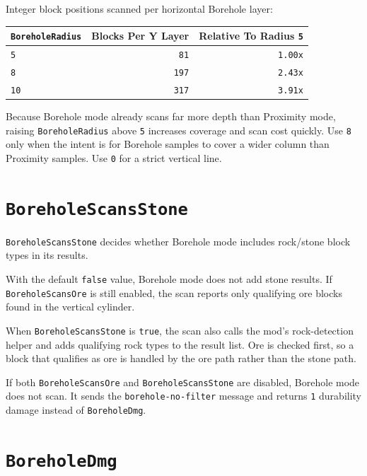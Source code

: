 \documentclass[
  11pt,
  letterpaper,
  titlepage]{article}
\newcounter{none} %
\begin{document}
Integer block positions scanned per horizontal Borehole layer:

{\def\LTcaptype{none} %
\begin{longtable}[]{@{}lrr@{}}
\toprule\noalign{}
\texttt{BoreholeRadius} & Blocks Per Y Layer & Relative To Radius
\texttt{5} \\
\midrule\noalign{}
\endhead
\bottomrule\noalign{}
\endlastfoot
\texttt{5} & \texttt{81} & \texttt{1.00x} \\
\texttt{8} & \texttt{197} & \texttt{2.43x} \\
\texttt{10} & \texttt{317} & \texttt{3.91x} \\
\end{longtable}
}

Because Borehole mode already scans far more depth than Proximity mode,
raising \texttt{BoreholeRadius} above \texttt{5} increases coverage and
scan cost quickly. Use \texttt{8} only when the intent is for Borehole
samples to cover a wider column than Proximity samples. Use \texttt{0}
for a strict vertical line.

\section{\texorpdfstring{\texttt{BoreholeScansStone}}{BoreholeScansStone}}\label{boreholescansstone}

\texttt{BoreholeScansStone} decides whether Borehole mode includes
rock/stone block types in its results.

With the default \texttt{false} value, Borehole mode does not add stone
results. If \texttt{BoreholeScansOre} is still enabled, the scan reports
only qualifying ore blocks found in the vertical cylinder.

When \texttt{BoreholeScansStone} is \texttt{true}, the scan also calls
the mod's rock-detection helper and adds qualifying rock types to the
result list. Ore is checked first, so a block that qualifies as ore is
handled by the ore path rather than the stone path.

If both \texttt{BoreholeScansOre} and \texttt{BoreholeScansStone} are
disabled, Borehole mode does not scan. It sends the
\texttt{borehole-no-filter} message and returns \texttt{1} durability
damage instead of \texttt{BoreholeDmg}.

\section{\texorpdfstring{\texttt{BoreholeDmg}}{BoreholeDmg}}\label{boreholedmg}
\end{document}
